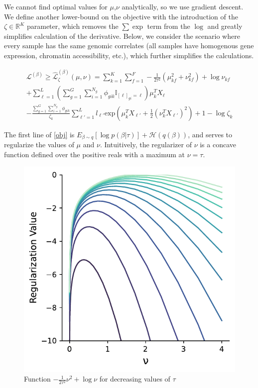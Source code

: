 \documentclass{article}
\newcommand{\Lagr}{\mathcal{L}}
\begin{document}
We cannot find optimal values for $\mu$,$\nu$ analytically, so we use gradient descent. We define another  lower-bound on the objective with the introduction of the $\zeta \in \mathbb{R}^K$ parameter, which removes the $\sum\exp$ term from the $\log$ and greatly simplifies calculation of the derivative. Below, we consider the scenario where every sample has the same genomic correlates (all samples have homogenous gene expression, chromatin accessibility, etc.), which further simplifies the calculations. 

\begin{equation} \label{obj}
\begin{split}
\Lagr^{(\beta)} \geq \hat{\Lagr}^{(\beta)}_{\zeta}(\mu,\nu) = \sum_{k=1}^{K}\sum_{f=1}^F  -\frac{1}{2\tau^2}(\mu_{kf}^2 + \nu_{kf}^2) + \log{\nu_{kf}} \\
	+ \sum_{\ell=1}^L \left(\sum_{g=1}^G\sum_{i=1}^{N_g} \phi_{gik} \mathbb{I}_{[\ell]_{gi} = \ell} \right) \mu_k^T X_{\ell} \\
	- \frac{ \sum_{g=1}^G\sum_{i=1}^{N_g} \phi_{gik} }{\zeta_k}  \sum_{\ell'=1}^L l_{\ell'}\textrm{exp}\left( \mu_k^T X_{\ell'} + \frac{1}{2}(\nu_k^T X_{\ell'})^2 \right) + 1 - \log{\zeta_k}
\end{split}
\end{equation}

The first line of \eqref{obj} is $E_{\beta \sim q}[\log p(\beta | \tau)]+\mathcal{H}(q(\beta))$, and serves to regularize the values of $\mu$ and $\nu$. Intuitively, the regularizer of $\nu$ is a concave function defined over the positive reals with a maximum at $\nu = \tau$. 

\begin{figure}[h]
\caption{Function $-\frac{1}{2\tau^2}\nu^2 + \log\nu$ for decreasing values of $\tau$}
\centering
\includegraphics[scale=0.65]{nu_regularization.pdf}
\end{figure}
\end{document}
